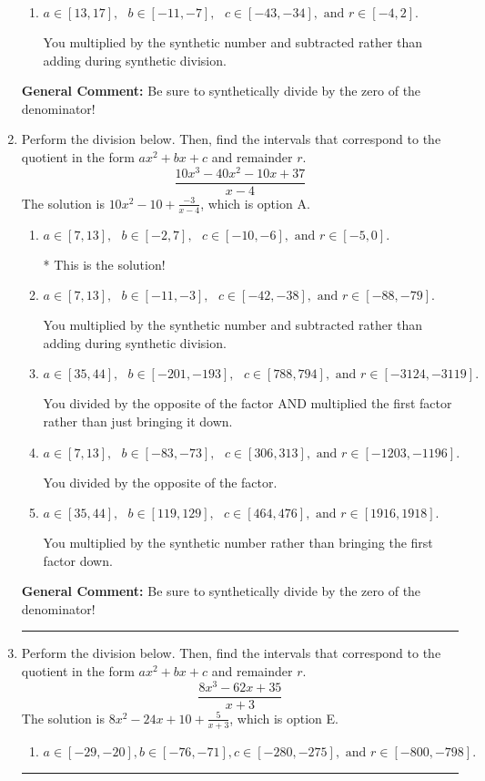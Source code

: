 \documentclass{extbook}[14pt]
\newcommand{\litem}[1]{\item #1

\rule{\textwidth}{0.4pt}}
\begin{document}
\begin{enumerate}
{\begin{enumerate}[label=\Alph*.]
 You multiplied by the synthetic number rather than bringing the first factor down.
\item \( a \in [13, 17], \text{   } b \in [-11, -7], \text{   } c \in [-43, -34], \text{   and   } r \in [-4, 2]. \)

 You multiplied by the synthetic number and subtracted rather than adding during synthetic division.
\end{enumerate}

\textbf{General Comment:} Be sure to synthetically divide by the zero of the denominator!
}
\litem{
Perform the division below. Then, find the intervals that correspond to the quotient in the form $ax^2+bx+c$ and remainder $r$.
\[ \frac{10x^{3} -40 x^{2} -10 x + 37}{x -4} \]The solution is \( 10x^{2} -10 + \frac{-3}{x -4} \), which is option A.\begin{enumerate}[label=\Alph*.]
\item \( a \in [7, 13], \text{   } b \in [-2, 7], \text{   } c \in [-10, -6], \text{   and   } r \in [-5, 0]. \)

* This is the solution!
\item \( a \in [7, 13], \text{   } b \in [-11, -3], \text{   } c \in [-42, -38], \text{   and   } r \in [-88, -79]. \)

 You multiplied by the synthetic number and subtracted rather than adding during synthetic division.
\item \( a \in [35, 44], \text{   } b \in [-201, -193], \text{   } c \in [788, 794], \text{   and   } r \in [-3124, -3119]. \)

 You divided by the opposite of the factor AND multiplied the first factor rather than just bringing it down.
\item \( a \in [7, 13], \text{   } b \in [-83, -73], \text{   } c \in [306, 313], \text{   and   } r \in [-1203, -1196]. \)

 You divided by the opposite of the factor.
\item \( a \in [35, 44], \text{   } b \in [119, 129], \text{   } c \in [464, 476], \text{   and   } r \in [1916, 1918]. \)

 You multiplied by the synthetic number rather than bringing the first factor down.
\end{enumerate}

\textbf{General Comment:} Be sure to synthetically divide by the zero of the denominator!
}
\litem{
Perform the division below. Then, find the intervals that correspond to the quotient in the form $ax^2+bx+c$ and remainder $r$.
\[ \frac{8x^{3} -62 x + 35}{x + 3} \]The solution is \( 8x^{2} -24 x + 10 + \frac{5}{x + 3} \), which is option E.\begin{enumerate}[label=\Alph*.]
\item \( a \in [-29, -20], b \in [-76, -71], c \in [-280, -275], \text{ and } r \in [-800, -798]. \)


\end{enumerate}}
\end{enumerate}
\end{document}
